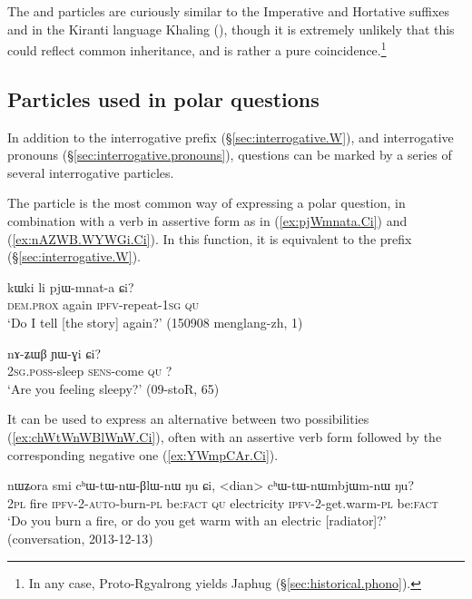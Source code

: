 The  and  particles are curiously similar to the Imperative and Hortative suffixes  and  in the Kiranti language Khaling (\citealt[1114--1123]{jacques12khaling}), though it is extremely unlikely that this could reflect common inheritance, and is rather a pure coincidence.\footnote{In any case, Proto-Rgyalrong  yields Japhug  (§\ref{sec:historical.phono}). }


\subsection{Particles used in polar questions} \label{sec:fsp.interrog}
In addition to the interrogative prefix  (§\ref{sec:interrogative.W}), and interrogative pronouns (§\ref{sec:interrogative.pronouns}), questions can be marked by a series of several interrogative particles.

The particle  is the most common way of expressing a polar question, in combination with a verb in assertive form as in (\ref{ex:pjWmnata.Ci}) and (\ref{ex:nAZWB.WYWGi.Ci}). In this function, it is equivalent to the prefix  (§\ref{sec:interrogative.W}).

\begin{exe}
\ex \label{ex:pjWmnata.Ci}
\gll kɯki li pjɯ-mnat-a ɕi? \\
\textsc{dem}.\textsc{prox} again \textsc{ipfv}-repeat-\textsc{1sg} \textsc{qu} \\
\glt `Do I tell [the story] again?' (150908 menglang-zh, 1)
\end{exe}

\begin{exe}
\ex \label{ex:nAZWB.WYWGi.Ci}
\gll nɤ-ʑɯβ ɲɯ-ɣi ɕi? \\
\textsc{2sg}.\textsc{poss}-sleep \textsc{sens}-come \textsc{qu} ? \\
\glt `Are you feeling sleepy?' (09-stoR,  65)
\end{exe}

It can be used to express an alternative between two possibilities (\ref{ex:chWtWnWBlWnW.Ci}), often with an assertive verb form followed by the corresponding negative one (\ref{ex:YWmpCAr.Ci}).

\begin{exe}
\ex \label{ex:chWtWnWBlWnW.Ci}
\gll nɯʑora smi cʰɯ-tɯ-nɯ-βlɯ-nɯ ŋu ɕi, <dian> cʰɯ-tɯ-nɯmbjɯm-nɯ ŋu? \\
\textsc{2pl} fire \textsc{ipfv}-2-\textsc{auto}-burn-\textsc{pl} be:\textsc{fact} \textsc{qu} electricity \textsc{ipfv}-2-get.warm-\textsc{pl} be:\textsc{fact} \\
\glt `Do you burn a fire, or do you get warm with an electric [radiator]?' (conversation, 2013-12-13)
\end{exe}

